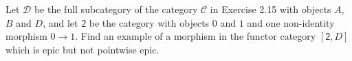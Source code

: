 Let $\mathcal{D}$ be the full subcategory of the category $\mathcal{C}$ in
Exercise 2.15 with objects $A$, $B$ and $D$, and let $\mathsf{2}$ be the
category with objects $0$ and $1$ and one non-identity morphism
$0\to 1$. Find an example of a morphism in the functor category $[\mathsf{2}, D]$
which is epic but not pointwise epic.
